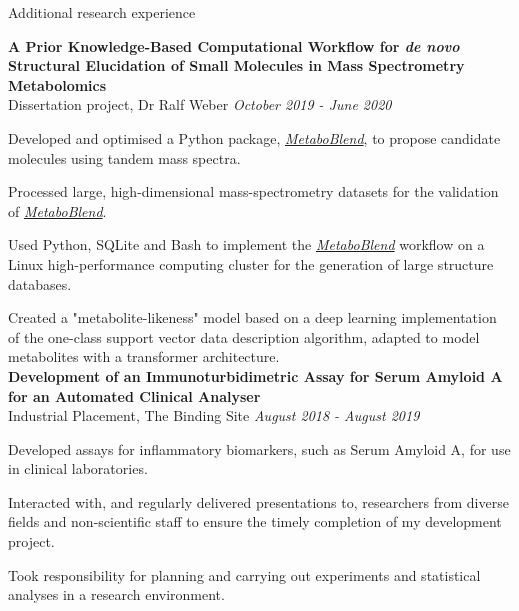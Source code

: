 \documentclass{resume}
\begin{document}
\begin{rSection}{Additional research experience}

\vspace{1pt plus 1pt}
\textbf{A Prior Knowledge-Based Computational Workflow for \textit{de novo} Structural Elucidation of Small Molecules in Mass Spectrometry Metabolomics} \\
Dissertation project, Dr Ralf Weber \hfill  \textit{October 2019 - June 2020}

\vspace{2pt plus 1pt minus 1pt}
\item Developed and optimised a Python package, \href{https://github.com/computational-metabolomics/metaboblend/tree/dev}{\textit{MetaboBlend}}, to propose candidate molecules using tandem mass spectra. 
\item Processed large, high-dimensional mass-spectrometry datasets for the validation of \href{https://github.com/computational-metabolomics/metaboblend/tree/dev}{\textit{MetaboBlend}}. 
\item Used Python, SQLite and Bash to implement the \href{https://github.com/computational-metabolomics/metaboblend/tree/dev}{\textit{MetaboBlend}} workflow on a Linux high-performance computing cluster for the generation of large structure databases.
\item Created a "metabolite-likeness" model based on a deep learning implementation of the one-class support vector data description algorithm, adapted to model metabolites with a transformer architecture. \\

\textbf{Development of an Immunoturbidimetric Assay for Serum Amyloid A for an Automated Clinical Analyser} \\
Industrial Placement, The Binding Site \hfill  \textit{August 2018 - August 2019}

\vspace{2pt plus 1pt minus 1pt}
\item Developed assays for inflammatory biomarkers, such as Serum Amyloid A, for use in clinical laboratories.
\item Interacted with, and regularly delivered presentations to, researchers from diverse fields and non-scientific staff to ensure the timely completion of my development project. 
\item Took responsibility for planning and carrying out experiments and statistical analyses in a research environment.

\end{rSection}
\end{document}
